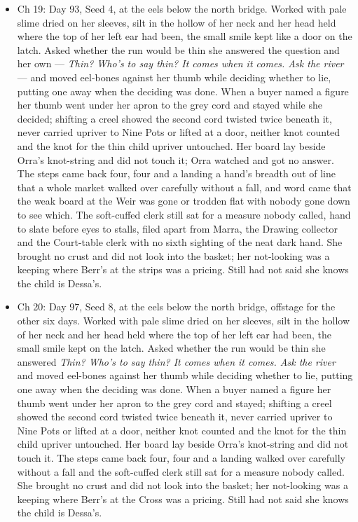 \documentclass{design/chronicle}
\begin{document}
{\begin{itemize}[leftmargin=1.4em,itemsep=1pt,topsep=3pt,parsep=0pt]
\item Ch 19: Day 93, Seed 4, at the eels below the north bridge. Worked with pale slime dried on her sleeves, silt in the hollow of her neck and her head held where the top of her left ear had been, the small smile kept like a door on the latch. Asked whether the run would be thin she answered the question and her own --- \emph{Thin? Who’s to say thin? It comes when it comes. Ask the river} --- and moved eel-bones against her thumb while deciding whether to lie, putting one away when the deciding was done. When a buyer named a figure her thumb went under her apron to the grey cord and stayed while she decided; shifting a creel showed the second cord twisted twice beneath it, never carried upriver to Nine Pots or lifted at a door, neither knot counted and the knot for the thin child upriver untouched. Her board lay beside Orra’s knot-string and did not touch it; Orra watched and got no answer. The steps came back four, four and a landing a hand’s breadth out of line that a whole market walked over carefully without a fall, and word came that the weak board at the Weir was gone or trodden flat with nobody gone down to see which. The soft-cuffed clerk still sat for a measure nobody called, hand to slate before eyes to stalls, filed apart from Marra, the Drawing collector and the Court-table clerk with no sixth sighting of the neat dark hand. She brought no crust and did not look into the basket; her not-looking was a keeping where Berr’s at the strips was a pricing. Still had not said she knows the child is Dessa’s.

\end{itemize}

\begin{itemize}[leftmargin=1.4em,itemsep=1pt,topsep=3pt,parsep=0pt]

\item Ch 20: Day 97, Seed 8, at the eels below the north bridge, offstage for the other six days. Worked with pale slime dried on her sleeves, silt in the hollow of her neck and her head held where the top of her left ear had been, the small smile kept on the latch. Asked whether the run would be thin she answered \emph{Thin? Who’s to say thin? It comes when it comes. Ask the river} and moved eel-bones against her thumb while deciding whether to lie, putting one away when the deciding was done. When a buyer named a figure her thumb went under her apron to the grey cord and stayed; shifting a creel showed the second cord twisted twice beneath it, never carried upriver to Nine Pots or lifted at a door, neither knot counted and the knot for the thin child upriver untouched. Her board lay beside Orra’s knot-string and did not touch it. The steps came back four, four and a landing walked over carefully without a fall and the soft-cuffed clerk still sat for a measure nobody called. She brought no crust and did not look into the basket; her not-looking was a keeping where Berr’s at the Cross was a pricing. Still had not said she knows the child is Dessa’s.

\end{itemize}
}
\end{document}
